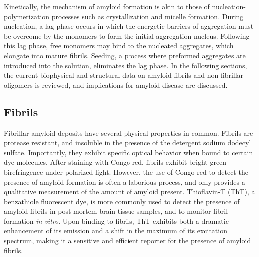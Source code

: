 Kinetically, the mechanism of amyloid formation is akin to those of nucleation-polymerization processes such as crystallization and micelle formation.\cite{Murphy:2002fe}
During nucleation, a lag phase occurs in which the energetic barriers of aggregation must be overcome by the monomers to form the initial aggregation nucleus.\cite{Murphy:2002fe} Following this lag phase, free monomers may bind to the nucleated aggregates, which elongate into mature fibrils.\cite{Murphy:2002fe} Seeding, a process where preformed aggregates are introduced into the solution, eliminates the lag phase.\cite{Harper:1997ix,Jarrett:1993vm} In the following sections, the current biophysical and structural data on amyloid fibrils and non-fibrillar oligomers is reviewed, and implications for amyloid disease are discussed.


\subsection{Fibrils}

Fibrillar amyloid deposits have several physical properties in common. Fibrils are protease resistant, and insoluble in the presence of the detergent sodium dodecyl sulfate.\cite{Eisenberg:2012hm} Importantly, they exhibit specific optical behavior when bound to certain dye molecules. After staining with Congo red, fibrils exhibit bright green birefringence under polarized light.\cite{Frid:2007bo} However, the use of Congo red to detect the presence of amyloid formation is often a laborious process, and only provides a qualitative measurement of the amount of amyloid present.\cite{Frid:2007bo} Thioflavin-T (ThT), a benzathiole fluorescent dye, is more commonly used to detect the presence of amyloid fibrils in post-mortem brain tissue samples, and to monitor fibril formation \textit{in vitro}. Upon binding to fibrils, ThT exhibits both a dramatic enhancement of its emission and a shift in the maximum of its excitation spectrum, making it a sensitive and efficient reporter for the presence of amyloid fibrils.\cite{Nilsson:2004iw}


